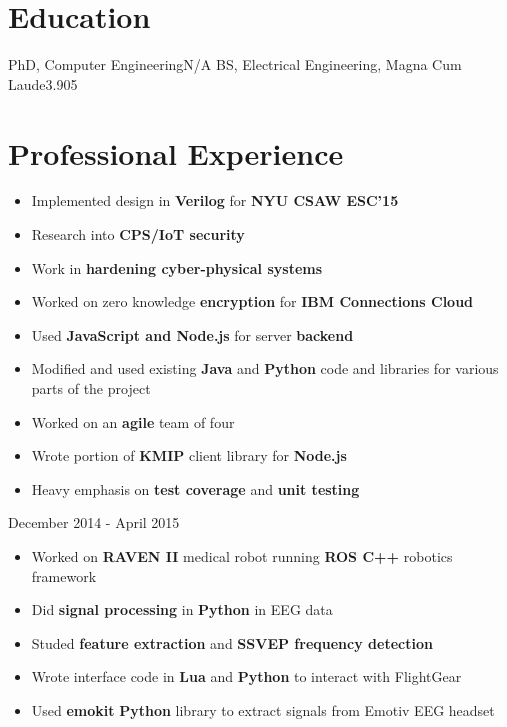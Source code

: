 \documentclass{my_resume}
\begin{document}

\section{Education}
    {PhD, Computer Engineering}{N/A}
	{BS, Electrical Engineering, Magna Cum Laude}{3.905}

\section{Professional Experience}
\begin{itemize}
    \itemsep0em
    \item Implemented design in \textbf{Verilog} for \textbf{NYU CSAW ESC'15}
    \item Research into \textbf{CPS/IoT security}
    \item Work in \textbf{hardening cyber-physical systems}
\end{itemize}
\begin{itemize}
    \itemsep0em
	\item Worked on zero knowledge \textbf{encryption} for 
		\textbf{IBM Connections Cloud}
	\item Used \textbf{JavaScript and Node.js} for server \textbf{backend}
	\item Modified and used existing \textbf{Java} and \textbf{Python} code
		and libraries for various parts of the project
	\item Worked on an \textbf{agile} team of four
	\item Wrote portion of \textbf{KMIP} client library for \textbf{Node.js}
    \item Heavy emphasis on \textbf{test coverage} and \textbf{unit testing}
\end{itemize}
	{December 2014 - April 2015}
\begin{itemize}
    \itemsep0em
	\item Worked on \textbf{RAVEN II} medical robot running \textbf{ROS C++}
		robotics framework
	\item Did \textbf{signal processing} in \textbf{Python} in EEG data
	\item Studed \textbf{feature extraction} and \textbf{SSVEP frequency detection}
	\item Wrote interface code in \textbf{Lua} and \textbf{Python} to interact
		with FlightGear
	\item Used \textbf{emokit} \textbf{Python} library to extract signals from
		Emotiv EEG headset
\end{itemize}
\end{document}
